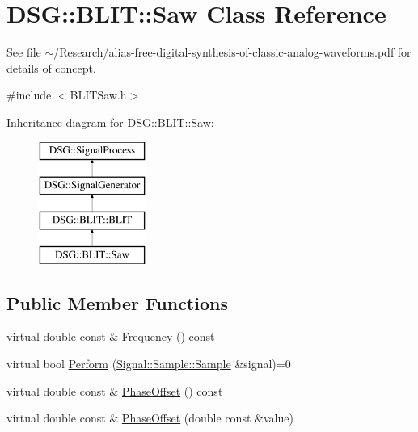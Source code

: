 \hypertarget{classDSG_1_1BLIT_1_1Saw}{\section{D\-S\-G\-:\-:B\-L\-I\-T\-:\-:Saw Class Reference}
\label{classDSG_1_1BLIT_1_1Saw}
}


See file $\sim$/\-Research/alias-\/free-\/digital-\/synthesis-\/of-\/classic-\/analog-\/waveforms.pdf for details of concept.  




{\ttfamily \#include $<$B\-L\-I\-T\-Saw.\-h$>$}

Inheritance diagram for D\-S\-G\-:\-:B\-L\-I\-T\-:\-:Saw\-:\begin{figure}[H]
\begin{center}
\leavevmode
\includegraphics[height=4.000000cm]{classDSG_1_1BLIT_1_1Saw}
\end{center}
\end{figure}
\subsection*{Public Member Functions}
\begin{DoxyCompactItemize}
\item 
virtual double const \& \hyperlink{classDSG_1_1SignalGenerator_aedac746c5a70818d120858542ecb7c45}{Frequency} () const 
\item 
virtual bool \hyperlink{classDSG_1_1SignalProcess_ae8a803d175eca1ec5f34a52035a082b4}{Perform} (\hyperlink{classDSG_1_1Signal_1_1Sample_a21db6fade3ee3554ed3887cb2b74daff}{Signal\-::\-Sample\-::\-Sample} \&signal)=0
\item 
virtual double const \& \hyperlink{classDSG_1_1SignalGenerator_a1ce521847edd0b837fd840998f906b4b}{Phase\-Offset} () const 
\item 
virtual double const \& \hyperlink{classDSG_1_1SignalGenerator_a08b71b1f30ba65e629642c570291dc0e}{Phase\-Offset} (double const \&value)
\end{DoxyCompactItemize}
